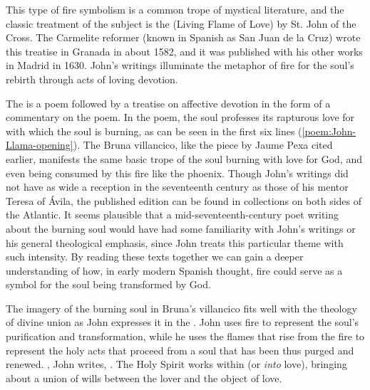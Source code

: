 This type of fire symbolism is a common trope of mystical literature, and the classic treatment of the subject is the  (Living Flame of Love) by St. John of the Cross.
The Carmelite reformer (known in Spanish as San Juan de la Cruz) wrote this treatise in Granada in about 1582, and it was published with his other works in Madrid in 1630.
John's writings illuminate the metaphor of fire for the soul's rebirth through acts of loving devotion.

The  is a poem followed by a treatise on affective devotion in the form of a commentary on the poem.
In the poem, the soul professes its rapturous love for  with which the soul is burning, as can be seen in the first six lines (\cref{poem:John-Llama-opening}).
The Bruna villancico, like the piece by Jaume Pexa cited earlier, manifests the same basic trope of the soul burning with love for God, and even being consumed by this fire like the phoenix.
Though John's writings did not have as wide a reception in the seventeenth century as those of his mentor Teresa of Ávila, the published edition can be found in collections on both sides of the Atlantic.
It seems plausible that a mid-seventeenth-century poet writing about the burning soul would have had some familiarity with John's writings or his general theological emphasis, since John treats this particular theme with such intensity.
By reading these texts together we can gain a deeper understanding of how, in early modern Spanish thought, fire could serve as a symbol for the soul being transformed by God.

% 	

The imagery of the burning soul in Bruna's villancico fits well with the theology of divine union as John expresses it in the .
John uses fire to represent the soul's purification and transformation, while he uses the flames that rise from the fire to represent the holy acts that proceed from a soul that has been thus purged and renewed.
, John writes, .%
	\Autocite[790]{JuandelaCruz:Llama}
The Holy Spirit works within  (or \emph{into} love), bringing about a union of wills between the lover and the object of love.

